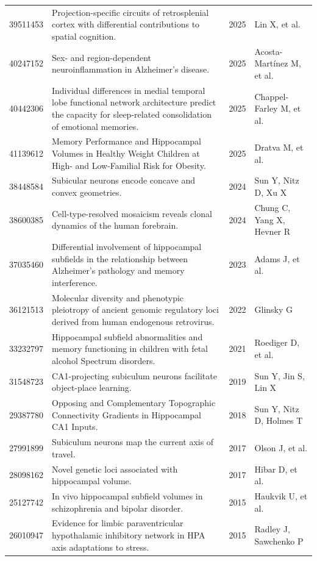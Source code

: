 \documentclass{../latex/analysis_report}
\begin{document}
\begin{longtable}{rp{6cm}lp{2.5cm}}
39511453 & Projection-specific circuits of retrosplenial cortex with differential contributions to spatial cognition. & 2025 & Lin X, et al. \\
40247152 & Sex- and region-dependent neuroinflammation in Alzheimer's disease. & 2025 & Acosta-Martínez M, et al. \\
40442306 & Individual differences in medial temporal lobe functional network architecture predict the capacity for sleep-related consolidation of emotional memories. & 2025 & Chappel-Farley M, et al. \\
41139612 & Memory Performance and Hippocampal Volumes in Healthy Weight Children at High- and Low-Familial Risk for Obesity. & 2025 & Dratva M, et al. \\
38448584 & Subicular neurons encode concave and convex geometries. & 2024 & Sun Y, Nitz D, Xu X \\
38600385 & Cell-type-resolved mosaicism reveals clonal dynamics of the human forebrain. & 2024 & Chung C, Yang X, Hevner R \\
37035460 & Differential involvement of hippocampal subfields in the relationship between Alzheimer's pathology and memory interference. & 2023 & Adams J, et al. \\
36121513 & Molecular diversity and phenotypic pleiotropy of ancient genomic regulatory loci derived from human endogenous retrovirus. & 2022 & Glinsky G \\
33232797 & Hippocampal subfield abnormalities and memory functioning in children with fetal alcohol Spectrum disorders. & 2021 & Roediger D, et al. \\
31548723 & CA1-projecting subiculum neurons facilitate object-place learning. & 2019 & Sun Y, Jin S, Lin X \\
29387780 & Opposing and Complementary Topographic Connectivity Gradients in Hippocampal CA1 Inputs. & 2018 & Sun Y, Nitz D, Holmes T \\
27991899 & Subiculum neurons map the current axis of travel. & 2017 & Olson J, et al. \\
28098162 & Novel genetic loci associated with hippocampal volume. & 2017 & Hibar D, et al. \\
25127742 & In vivo hippocampal subfield volumes in schizophrenia and bipolar disorder. & 2015 & Haukvik U, et al. \\
26010947 & Evidence for limbic paraventricular hypothalamic inhibitory network in HPA axis adaptations to stress. & 2015 & Radley J, Sawchenko P \\

\end{longtable}
\end{document}
